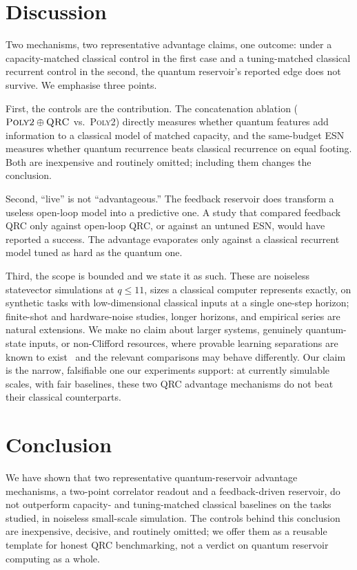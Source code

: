 ﻿\documentclass[10pt,conference]{IEEEtran}
\begin{document}
\section{Discussion}

Two mechanisms, two representative advantage claims, one outcome: under a
capacity-matched classical control in the first case and a tuning-matched
classical recurrent control in the second, the quantum reservoir's reported edge
does not survive. We emphasise three points.

First, the controls are the contribution. The concatenation ablation
($\textsc{Poly2}\oplus\textsc{QRC}$ vs.\ \textsc{Poly2}) directly measures whether
quantum features add information to a classical model of matched capacity, and the
same-budget ESN measures whether quantum recurrence beats classical recurrence on
equal footing. Both are inexpensive and routinely omitted; including them changes
the conclusion.

Second, ``live'' is not ``advantageous.'' The feedback reservoir does transform a
useless open-loop model into a predictive one. A study that compared feedback QRC
only against open-loop QRC, or against an untuned ESN, would have reported a
success. The advantage evaporates only against a classical recurrent model tuned
as hard as the quantum one.

Third, the scope is bounded and we state it as such. These are noiseless
statevector simulations at $q \le 11$, sizes a classical computer represents
exactly, on synthetic tasks with low-dimensional classical inputs at a single
one-step horizon; finite-shot and hardware-noise studies, longer horizons, and
empirical series are natural extensions. We make no claim about larger systems,
genuinely quantum-state inputs, or non-Clifford resources, where provable learning
separations are known to exist~\cite{huang2022} and the relevant comparisons may
behave differently. Our claim is the narrow, falsifiable one our experiments
support: at currently simulable scales, with fair baselines, these two QRC
advantage mechanisms do not beat their classical counterparts.

\section{Conclusion}

We have shown that two representative quantum-reservoir advantage mechanisms, a
two-point correlator readout and a feedback-driven reservoir, do not outperform
capacity- and tuning-matched classical baselines on the tasks studied, in
noiseless small-scale simulation. The controls behind this conclusion are
inexpensive, decisive, and routinely omitted; we offer them as a reusable
template for honest QRC benchmarking, not a verdict on quantum reservoir
computing as a whole.
\end{document}
